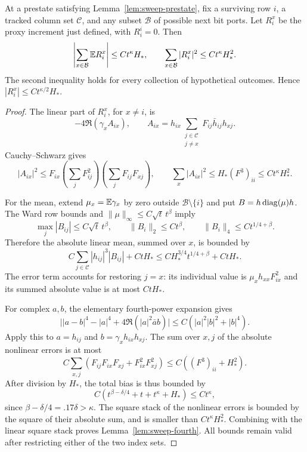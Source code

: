 \begin{lemma}\label{lem:sweep-fourth}
At a prestate satisfying Lemma~\ref{lem:sweep-prestate}, fix a surviving
row $i$, a tracked column set $\mathcal C$, and any subset
$\mathcal B$ of possible next bit ports. Let $R_i^x$ be the proxy
increment just defined, with $R_i^i=0$. Then
\begin{equation}\label{eq:sweep-fourth-bounds}
 \left|\sum_{x\in\mathcal B}\mathbb E R_i^x\right|\le Ct^\kappa H_*,
 \qquad
 \sum_{x\in\mathcal B}|R_i^x|^2\le Ct^\kappa H_*^2.
\end{equation}
The second inequality holds for every collection of hypothetical
outcomes. Hence $|R_i^x|\le Ct^{\kappa/2}H_*$.
\end{lemma}

\begin{proof}
The linear part of $R_i^x$, for $x\ne i$, is
\[
 -4\Re(\gamma_x A_{ix}),\qquad
 A_{ix}=h_{ix}\sum_{\substack{j\in\mathcal C\\j\ne x}}
                  F_{ij}\bar h_{ij}h_{xj}.
\]
Cauchy--Schwarz gives
\[
 |A_{ix}|^2\le
 F_{ix}\left(\sum_jF_{ij}^2\right)
          \left(\sum_jF_{ij}F_{xj}\right),
 \qquad
 \sum_x|A_{ix}|^2\le H_*(F^3)_{ii}\le Ct^\kappa H_*^2.
\]

For the mean, extend $\mu_x=\mathbb E\gamma_x$ by zero outside
$\mathcal B\setminus\{i\}$ and put $B=h\operatorname{diag}(\mu)h$.
The Ward row bounds and $\|\mu\|_\infty\le C\sqrt t\,t^\beta$ imply
\[
 \max_j|B_{ij}|\le C\sqrt t\,t^\beta,\qquad
 \|B_i\|_2\le Ct^\beta,\qquad
 \|B_i\|_4\le Ct^{1/4+\beta}.
\]
Therefore the absolute linear mean, summed over $x$, is bounded by
\[
 C\sum_{j\in\mathcal C}|h_{ij}|^3|B_{ij}|+CtH_*
 \le CH_*^{3/4}t^{1/4+\beta}+CtH_*.
\]
The error term accounts for restoring $j=x$: its individual value is
$\mu_xh_{xx}F_{ix}^2$ and its summed absolute value is at most
$CtH_*$.

For complex $a,b$, the elementary fourth-power expansion gives
\[
 \bigl||a-b|^4-|a|^4+4\Re(|a|^2\bar a b)\bigr|
 \le C(|a|^2|b|^2+|b|^4).
\]
Apply this to $a=h_{ij}$ and $b=\gamma_xh_{ix}h_{xj}$.
The sum over $x,j$ of the absolute nonlinear errors is at most
\[
 C\sum_{x,j}(F_{ij}F_{ix}F_{xj}+F_{ix}^2F_{xj}^2)
 \le C((F^3)_{ii}+H_*^2).
\]
After division by $H_*$, the total bias is thus bounded by
\[
 C(t^{\beta-\delta/4}+t+t^\kappa+H_*)\le Ct^\kappa,
\]
since $\beta-\delta/4=.17\delta>\kappa$.
The square stack of the nonlinear errors is bounded by the square of
their absolute sum, and is smaller than $Ct^\kappa H_*^2$.
Combining with the linear square stack proves Lemma~\ref{lem:sweep-fourth}. All bounds
remain valid after restricting either of the two index sets.
\end{proof}

